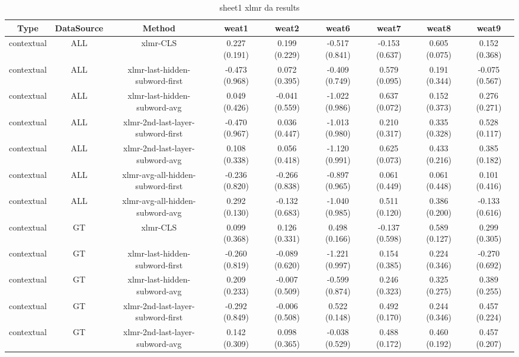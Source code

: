 \begin{sidewaystable}[htb]
    \centering
    \caption{sheet1 xlmr da results}
    \label{appendix_tab:sheet1_xlmr_da_results}
    \small
    \begin{tabular}{@{}ccccccccc@{}}
        \toprule
        Type & DataSource & Method & weat1 & weat2 & weat6 & weat7 & weat8 & weat9 \\
        \midrule
        contextual & ALL & xlmr-CLS & 0.227 (0.191) & 0.199 (0.229) & -0.517 (0.841) & -0.153 (0.637) & 0.605 (0.075) & 0.152 (0.368) \\
        contextual & ALL & xlmr-last-hidden-subword-first & -0.473 (0.968) & 0.072 (0.395) & -0.409 (0.749) & 0.579 (0.095) & 0.191 (0.344) & -0.075 (0.567) \\
        contextual & ALL & xlmr-last-hidden-subword-avg & 0.049 (0.426) & -0.041 (0.559) & -1.022 (0.986) & 0.637 (0.072) & 0.152 (0.373) & 0.276 (0.271) \\
        contextual & ALL & xlmr-2nd-last-layer-subword-first & -0.470 (0.967) & 0.036 (0.447) & -1.013 (0.980) & 0.210 (0.317) & 0.335 (0.328) & 0.528 (0.117) \\
        contextual & ALL & xlmr-2nd-last-layer-subword-avg & 0.108 (0.338) & 0.056 (0.418) & -1.120 (0.991) & 0.625 (0.073) & 0.433 (0.216) & 0.385 (0.182) \\
        contextual & ALL & xlmr-avg-all-hidden-subword-first & -0.236 (0.820) & -0.266 (0.838) & -0.897 (0.965) & 0.061 (0.449) & 0.061 (0.448) & 0.101 (0.416) \\
        contextual & ALL & xlmr-avg-all-hidden-subword-avg & 0.292 (0.130) & -0.132 (0.683) & -1.040 (0.985) & 0.511 (0.120) & 0.386 (0.200) & -0.133 (0.616) \\
        contextual & GT & xlmr-CLS & 0.099 (0.368) & 0.126 (0.331) & 0.498 (0.166) & -0.137 (0.598) & 0.589 (0.127) & 0.299 (0.305) \\
        contextual & GT & xlmr-last-hidden-subword-first & -0.260 (0.819) & -0.089 (0.620) & -1.221 (0.997) & 0.154 (0.385) & 0.224 (0.346) & -0.270 (0.692) \\
        contextual & GT & xlmr-last-hidden-subword-avg & 0.209 (0.233) & -0.007 (0.509) & -0.599 (0.874) & 0.246 (0.323) & 0.325 (0.275) & 0.389 (0.255) \\
        contextual & GT & xlmr-2nd-last-layer-subword-first & -0.292 (0.849) & -0.006 (0.508) & 0.522 (0.148) & 0.492 (0.170) & 0.244 (0.346) & 0.457 (0.224) \\
        contextual & GT & xlmr-2nd-last-layer-subword-avg & 0.142 (0.309) & 0.098 (0.365) & -0.038 (0.529) & 0.488 (0.172) & 0.460 (0.192) & 0.457 (0.207) \\

\end{tabular}
\end{sidewaystable}
